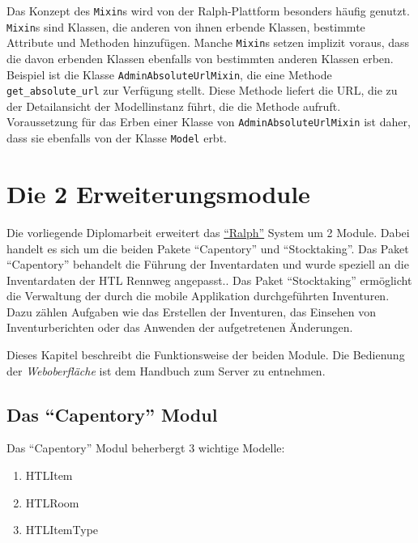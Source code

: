 Das Konzept des \texttt{Mixin}s wird von der Ralph-Plattform besonders
häufig genutzt. \texttt{Mixin}s sind Klassen, die anderen von ihnen
erbende Klassen, bestimmte Attribute und Methoden hinzufügen. Manche
\texttt{Mixin}s setzen implizit voraus, dass die davon erbenden Klassen
ebenfalls von bestimmten anderen Klassen erben. Beispiel ist die Klasse
\texttt{AdminAbsoluteUrlMixin}, die eine Methode
\texttt{get\_absolute\_url} zur Verfügung stellt. Diese Methode liefert
die URL, die zu der Detailansicht der Modellinstanz führt, die die
Methode aufruft. Voraussetzung für das Erben einer Klasse von
\texttt{AdminAbsoluteUrlMixin} ist daher, dass sie ebenfalls von der
Klasse \texttt{Model} erbt.

\chapter{Die 2 Erweiterungsmodule}

Die vorliegende Diplomarbeit erweitert das
\protect\hyperlink{django-und-ralph}{``Ralph''} System um 2 Module.
Dabei handelt es sich um die beiden Pakete ``Capentory'' und
``Stocktaking''. Das Paket ``Capentory'' behandelt die Führung der
Inventardaten und wurde speziell an die Inventardaten der HTL Rennweg
angepasst.. Das Paket ``Stocktaking'' ermöglicht die Verwaltung der
durch die mobile Applikation durchgeführten Inventuren. Dazu zählen
Aufgaben wie das Erstellen der Inventuren, das Einsehen von
Inventurberichten oder das Anwenden der aufgetretenen Änderungen.

Dieses Kapitel beschreibt die Funktionsweise der beiden Module. Die
Bedienung der \emph{Weboberfläche}
ist dem  Handbuch zum Server zu entnehmen.

\hypertarget{das-capentory-modul}{%
\section{Das ``Capentory'' Modul}\label{das-capentory-modul}}

Das ``Capentory'' Modul beherbergt 3 wichtige Modelle:

\begin{enumerate}
\def\labelenumi{\arabic{enumi}.}
\tightlist
\item
  HTLItem
\item
  HTLRoom
\item
  HTLItemType
\end{enumerate}

